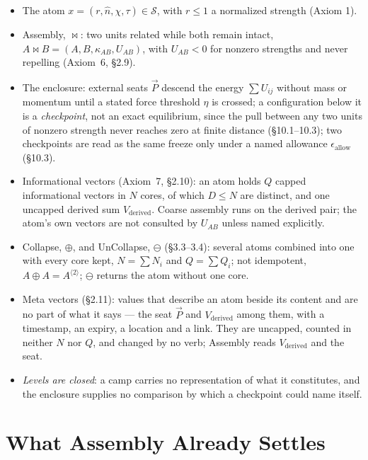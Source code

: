 \documentclass[12pt, a4paper]{article}
\begin{document}
\begin{itemize}
\item The atom $x=(r,\hat n,\chi,\tau)\in\mathcal{S}$, with $r\le 1$
      a normalized strength (Axiom 1).
\item Assembly, $\bowtie$: two units related while both remain
      intact, $A\bowtie B=(A,B,\kappa_{AB},U_{AB})$, with
      $U_{AB}<0$ for nonzero strengths and never repelling (Axiom~6, \S2.9).
\item The enclosure: external seats $\vec P$ descend the energy
      $\sum U_{ij}$ without mass or momentum until a stated force
      threshold $\eta$ is crossed; a configuration below it is a
      \emph{checkpoint}, not an exact equilibrium, since the pull
      between any two units of nonzero strength never reaches zero
      at finite distance (\S10.1--10.3); two checkpoints are read as the same freeze only under a
      named allowance $\epsilon_{\text{allow}}$ (\S10.3).
\item Informational vectors (Axiom~7, \S2.10): an atom holds $Q$
      capped informational vectors in $N$ cores, of which $D\le N$ are
      distinct, and one uncapped derived sum $V_{\mathrm{derived}}$.
      Coarse assembly runs on the derived pair; the atom's own
      vectors are not consulted by $U_{AB}$ unless named explicitly.
\item Collapse, $\oplus$, and UnCollapse, $\ominus$ (\S3.3--3.4):
      several atoms combined into one with every core kept,
      $N=\sum N_i$ and $Q=\sum Q_i$; not idempotent,
      $A\oplus A=A^{\langle 2\rangle}$; $\ominus$ returns the atom
      without one core.
\item Meta vectors (\S2.11): values that describe an atom beside its
      content and are no part of what it says --- the seat $\vec P$
      and $V_{\mathrm{derived}}$ among them, with a timestamp, an
      expiry, a location and a link. They are uncapped, counted in
      neither $N$ nor $Q$, and changed by no verb; Assembly reads
      $V_{\mathrm{derived}}$ and the seat.
\item \emph{Levels are closed}: a camp carries no representation of
      what it constitutes, and the enclosure supplies no comparison
      by which a checkpoint could name itself.
\end{itemize}

\section{What Assembly Already Settles}
\label{sec:already_settled}
\end{document}

